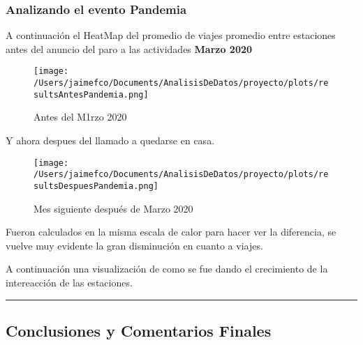 \documentclass[
]{article}
\begin{document}
\hypertarget{analizando-el-evento-pandemia}{%
\subsubsection{Analizando el evento
Pandemia}\label{analizando-el-evento-pandemia}}

A continuación el HeatMap del promedio de viajes promedio entre
estaciones antes del anuncio del paro a las actividades \textbf{Marzo
2020}

\begin{figure}
\centering
\texttt{[image: /Users/jaimefco/Documents/AnalisisDeDatos/proyecto/plots/resultsAntesPandemia.png]}
\caption{Antes del M1rzo 2020}
\end{figure}

Y ahora despues del llamado a quedarse en casa.

\begin{figure}
\centering
\texttt{[image: /Users/jaimefco/Documents/AnalisisDeDatos/proyecto/plots/resultsDespuesPandemia.png]}
\caption{Mes siguiente después de Marzo 2020}
\end{figure}

Fueron calculados en la misma escala de calor para hacer ver la
diferencia, se vuelve muy evidente la gran disminución en cuanto a
viajes.

A continuación una visualización de como se fue dando el crecimiento de
la intereacción de las estaciones.


\begin{center}\rule{0.5\linewidth}{0.5pt}\end{center}

\hypertarget{conclusiones-y-comentarios-finales}{%
\subsection{Conclusiones y Comentarios
Finales}\label{conclusiones-y-comentarios-finales}}
\end{document}
